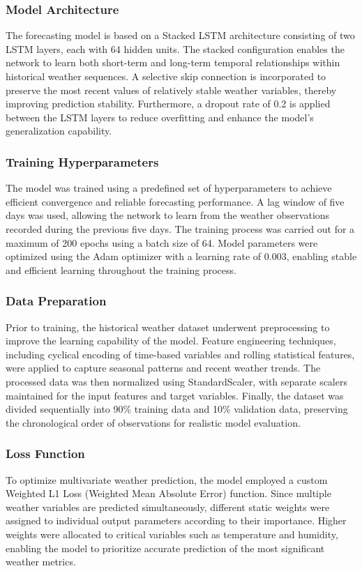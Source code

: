 \documentclass[12pt]{article}
\begin{document}
\subsubsection{Model Architecture}
The forecasting model is based on a Stacked LSTM architecture consisting of two LSTM layers, each with 64 hidden units. The stacked configuration enables the network to learn both short-term and long-term temporal relationships within historical weather sequences. A selective skip connection is incorporated to preserve the most recent values of relatively stable weather variables, thereby improving prediction stability. Furthermore, a dropout rate of 0.2 is applied between the LSTM layers to reduce overfitting and enhance the model's generalization capability.

\subsubsection{Training Hyperparameters}
The model was trained using a predefined set of hyperparameters to achieve efficient convergence and reliable forecasting performance. A lag window of five days was used, allowing the network to learn from the weather observations recorded during the previous five days. The training process was carried out for a maximum of 200 epochs using a batch size of 64. Model parameters were optimized using the Adam optimizer with a learning rate of 0.003, enabling stable and efficient learning throughout the training process.

\subsubsection{Data Preparation}
Prior to training, the historical weather dataset underwent preprocessing to improve the learning capability of the model. Feature engineering techniques, including cyclical encoding of time-based variables and rolling statistical features, were applied to capture seasonal patterns and recent weather trends. The processed data was then normalized using StandardScaler, with separate scalers maintained for the input features and target variables. Finally, the dataset was divided sequentially into 90\% training data and 10\% validation data, preserving the chronological order of observations for realistic model evaluation.

\subsubsection{Loss Function}
To optimize multivariate weather prediction, the model employed a custom Weighted L1 Loss (Weighted Mean Absolute Error) function. Since multiple weather variables are predicted simultaneously, different static weights were assigned to individual output parameters according to their importance. Higher weights were allocated to critical variables such as temperature and humidity, enabling the model to prioritize accurate prediction of the most significant weather metrics.
\end{document}
